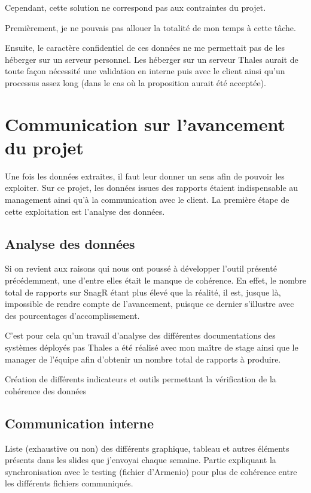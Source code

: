 Cependant, cette solution ne correspond pas aux contraintes du projet. 

Premièrement, je ne pouvais pas allouer la totalité de mon temps à cette tâche.

Ensuite, le caractère confidentiel de ces données ne me permettait pas de les héberger sur un serveur personnel. Les héberger sur un serveur Thales aurait de toute façon nécessité une validation en interne puis avec le client ainsi qu'un processus assez long (dans le cas où la proposition aurait été acceptée).


\newpage
\section{Communication sur l'avancement du projet}

Une fois les données extraites, il faut leur donner un sens afin de pouvoir les exploiter. Sur ce projet, les données issues des rapports étaient indispensable au management ainsi qu'à la communication avec le client. La première étape de cette exploitation est l'analyse des données.

\subsection{Analyse des données}
Si on revient aux raisons qui nous ont poussé à développer l'outil présenté précédemment, une d'entre elles était le manque de cohérence. 
En effet, le nombre total de rapports sur \gls{SnagR} étant plus élevé que la réalité, il est, jusque là, impossible de rendre compte de l'avancement, puisque ce dernier s'illustre avec des pourcentages d'accomplissement. 

C'est pour cela qu'un travail d'analyse des différentes documentations des systèmes déployés pas Thales a été réalisé avec mon maître de stage ainsi que le manager de l'équipe afin d'obtenir un nombre total de rapports à produire.

Création de différents indicateurs et outils permettant la vérification de la cohérence des données



\subsection{Communication interne}
Liste (exhaustive ou non) des différents graphique, tableau et autres éléments présents dans les slides que j'envoyai chaque semaine. 
Partie expliquant la synchronisation avec le testing (fichier d'Armenio) pour plus de cohérence entre les différents fichiers communiqués.

